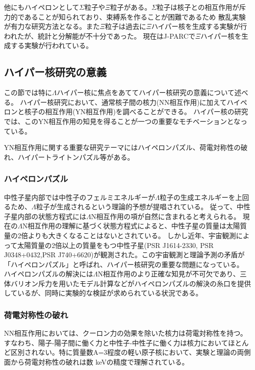 \documentclass[a4paper,11pt,uplatex]{jsbook}
\begin{document}
他にもハイペロンとして$\Sigma$粒子や$\Xi$粒子がある。$\Sigma$粒子は核子との相互作用が斥力的であることが知られており、束縛系を作ることが困難であるため
散乱実験が有力な研究方法となる。また$\Xi$粒子は過去に$\Xi$ハイパー核を生成する実験が行われた\cite{fukuda,khaustov}が、統計と分解能が不十分であった。
現在はJ-PARCで$\Xi$ハイパー核を生成する実験が行われている。

\subsection{ハイパー核研究の意義}
この節では特に$\Lambda$ハイパー核に焦点をあててハイパー核研究の意義について述べる。
ハイパー核研究において、通常核子間の核力(NN相互作用)に加えてハイペロンと核子の相互作用(YN相互作用)を調べることができる。
ハイパー核の研究では、このYN相互作用の知見を得ることが一つの重要なモチベーションとなっている。

YN相互作用に関する重要な研究テーマにはハイペロンパズル、荷電対称性の破れ、ハイパートライトンパズル等がある。
\subsubsection{ハイペロンパズル}
中性子星内部では中性子のフェルミエネルギーが$\Lambda$粒子の生成エネルギーを上回るため、$\Lambda$粒子が生成されるという理論的予想が提唱されている\cite{Ambartsumyan}。
従って、中性子星内部の状態方程式には$\Lambda$N相互作用の項が自然に含まれると考えられる。
現在の$\Lambda$N相互作用の理解に基づく状態方程式によると、中性子星の質量は太陽質量の2倍よりも大きくなることはないとされている\cite{schulze}。
しかし近年、宇宙観測によって太陽質量の2倍以上の質量をもつ中性子星(PSR J1614-2330\cite{demorest2010}, PSR J0348+0432\cite{antoniadis2013},PSR J740+6620\cite{cromartie2019})が観測された。この宇宙観測と理論予測の矛盾が「ハイペロンパズル」と呼ばれ、ハイパー核研究の重要な問題になっている。
ハイペロンパズルの解決には$\Lambda$N相互作用のより正確な知見が不可欠であり、三体バリオン斥力を用いたモデル計算\cite{yamamoto2014}などがハイペロンパズルの解決の糸口を提供しているが、同時に実験的な検証が求められている状況である。

\subsubsection{荷電対称性の破れ}
NN相互作用においては、クーロン力の効果を除いた核力は荷電対称性を持つ。すなわち、陽子-陽子間に働く力と中性子-中性子に働く力は核力においてほとんど区別されない。特に質量数A=3程度の軽い原子核において、実験と理論の両側面から荷電対称性の破れは数 keVの精度で理解されている\cite{Audi,NagaoD,friar1970, coon}。
\end{document}
